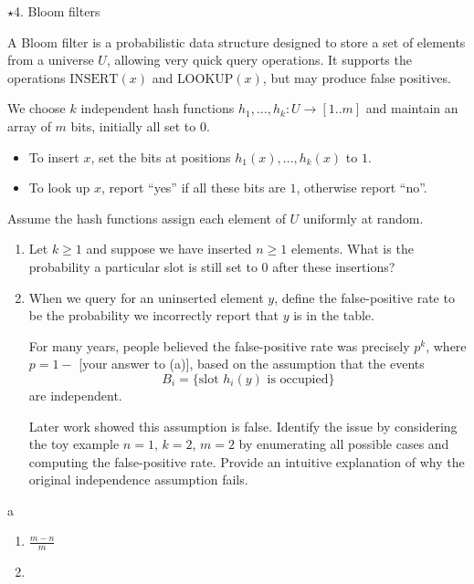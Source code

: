 \documentclass[12pt]{article}
\begin{document}
\begin{problem}{$\star$4. Bloom filters}

A Bloom filter is a probabilistic data structure designed to store a set of elements from a universe $U$, allowing very quick query operations. It supports the operations $\text{INSERT}(x)$ and $\text{LOOKUP}(x)$, but may produce false positives.

We choose $k$ independent hash functions $h_1, \dots, h_k : U \to [1..m]$ and maintain an array of $m$ bits, initially all set to $0$.

\begin{itemize}
    \item To insert $x$, set the bits at positions $h_1(x), \dots, h_k(x)$ to $1$.
    \item To look up $x$, report ``yes'' if all these bits are $1$, otherwise report ``no''.
\end{itemize}

Assume the hash functions assign each element of $U$ uniformly at random.

\begin{enumerate}
    \item Let $k \ge 1$ and suppose we have inserted $n \ge 1$ elements. What is the probability a particular slot is still set to $0$ after these insertions?
    
    \item When we query for an uninserted element $y$, define the false-positive rate to be the probability we incorrectly report that $y$ is in the table.

    For many years, people believed the false-positive rate was precisely $p^k$, where $p = 1 -$ [your answer to (a)], based on the assumption that the events
    \[
    B_i = \{\text{slot } h_i(y) \text{ is occupied}\}
    \]
    are independent.

    Later work showed this assumption is false. Identify the issue by considering the toy example $n=1$, $k=2$, $m=2$ by enumerating all possible cases and computing the false-positive rate. Provide an intuitive explanation of why the original independence assumption fails.
\end{enumerate}a
\end{problem}

\begin{solution}
    \bbni
    \begin{enumerate}
        \item  $\frac{m-n}{m}$
        \item 
    \end{enumerate}
\end{solution}
\end{document}
